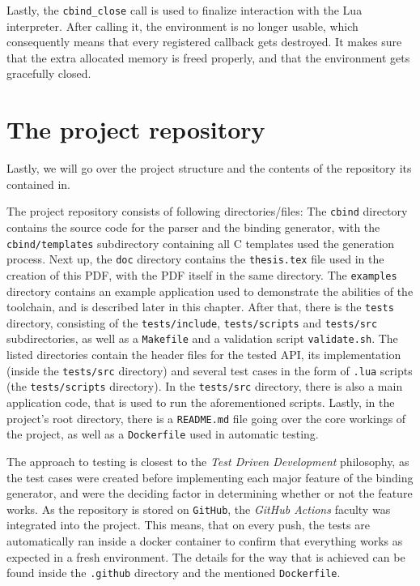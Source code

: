 \documentclass[polish, english]{iithesis}
\begin{document}
    Lastly, the \texttt{cbind\_close} call is used to finalize interaction with the Lua interpreter.
    After calling it, the environment is no longer usable, which consequently means that every registered callback gets destroyed.
    It makes sure that the extra allocated memory is freed properly, and that the environment gets gracefully closed.

\chapter{The project repository}
  Lastly, we will go over the project structure and the contents of the repository its contained in.

  The project repository consists of following directories/files:
  The \texttt{cbind} directory contains the source code for the parser and the binding generator, with the \texttt{cbind/templates} subdirectory containing all C templates used the generation process.
  Next up, the \texttt{doc} directory contains the \texttt{thesis.tex} file used in the creation of this PDF, with the PDF itself in the same directory.
  The \texttt{examples} directory contains an example application used to demonstrate the abilities of the toolchain, and is described later in this chapter.
  After that, there is the \texttt{tests} directory, consisting of the \texttt{tests/include}, \texttt{tests/scripts} and \texttt{tests/src} subdirectories, as well as a \texttt{Makefile} and a validation script \texttt{validate.sh}.
  The listed directories contain the header files for the tested API, its implementation (inside the \texttt{tests/src} directory) and several test cases in the form of \texttt{.lua} scripts (the \texttt{tests/scripts} directory).
  In the \texttt{tests/src} directory, there is also a main application code, that is used to run the aforementioned scripts.
  Lastly, in the project's root directory, there is a \texttt{README.md} file going over the core workings of the project, as well as a \texttt{Dockerfile} used in automatic testing.

  The approach to testing is closest to the \textit{Test Driven Development} philosophy, as the test cases were created before implementing each major feature of the binding generator, and were the deciding factor in determining whether or not the feature works.
  As the repository is stored on \texttt{GitHub}, the \textit{GitHub Actions} faculty was integrated into the project.
  This means, that on every push, the tests are automatically ran inside a docker container to confirm that everything works as expected in a fresh environment.
  The details for the way that is achieved can be found inside the \texttt{.github} directory and the mentioned \texttt{Dockerfile}.
\end{document}
